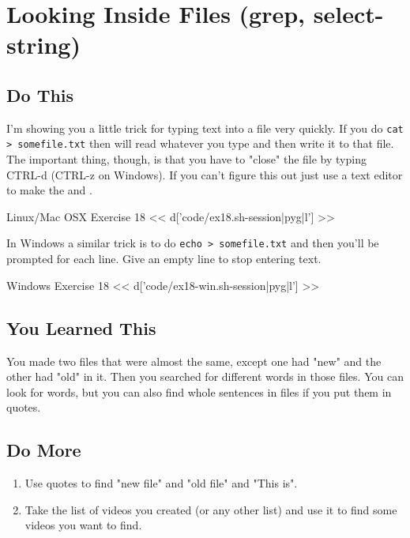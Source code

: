 \chapter{Looking Inside Files (grep, select-string)}

\section{Do This}

I'm showing you a little trick for typing text into a file very quickly.  If you
do \verb|cat > somefile.txt| then  will read whatever you type and
then write it to that file.  The important thing, though, is that you have to
"close" the file by typing CTRL-d (CTRL-z on Windows).  If you can't figure this 
out just use a text editor to make the  and .

\begin{code}{Linux/Mac OSX Exercise 18}
<< d['code/ex18.sh-session|pyg|l'] >>
\end{code}

In Windows a similar trick is to do \verb|echo > somefile.txt| and then you'll
be prompted for each line.  Give an empty line to stop entering text.

\begin{code}{Windows Exercise 18}
<< d['code/ex18-win.sh-session|pyg|l'] >>
\end{code}

\section{You Learned This}

You made two files that were almost the same, except one had "new" and the other 
had "old" in it.  Then you searched for different words in those files.  You can look for words, but you can also find whole sentences in
files if you put them in quotes.

\section{Do More}

\begin{enumerate}
\item Use quotes to find "new file" and "old file" and "This is".
\item Take the list of videos you created (or any other list) and use it to find some videos you want to find.
\end{enumerate}

